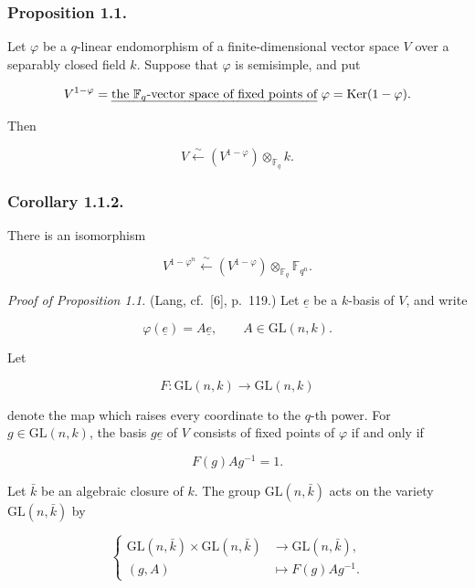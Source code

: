 \subsubsection*{Proposition 1.1.}
Let $\varphi$ be a $q$-linear endomorphism of a finite-dimensional vector
space $V$ over a separably closed field $k$. Suppose that $\varphi$ is
semisimple, and put

\[
V^{1-\varphi}
=\text{\underline{the $\mathbb F_q$-vector space of fixed points of} $\varphi$}
=\Ker(1-\varphi).
\]

Then

\begin{equation}\tag{1.1.1}
V\xleftarrow{\ \sim\ }
(V^{1-\varphi})\otimes_{\mathbb F_q}k.
\end{equation}

\subsubsection*{Corollary 1.1.2.}
There is an isomorphism

\[
V^{1-\varphi^n}\xleftarrow{\ \sim\ }
(V^{1-\varphi})\otimes_{\mathbb F_q}\mathbb F_{q^n}.
\]

\medskip
\noindent\emph{Proof of Proposition 1.1.}
(Lang, cf.~[6], p.~119.)
Let $\underline{e}$ be a $k$-basis of $V$, and write

\begin{equation}\tag{1.1.3}
\varphi(\underline{e})=A\underline{e},\qquad A\in\mathrm{GL}(n,k).
\end{equation}

Let

\begin{equation}\tag{1.1.4}
F:\mathrm{GL}(n,k)\longrightarrow\mathrm{GL}(n,k)
\end{equation}

denote the map which raises every coordinate to the $q$-th power. For
$g\in\mathrm{GL}(n,k)$, the basis $g\underline{e}$ of $V$ consists of fixed points of
$\varphi$ if and only if

\begin{equation}\tag{1.1.5}
F(g)Ag^{-1}=1.
\end{equation}

Let $\bar k$ be an algebraic closure of $k$. The group
$\mathrm{GL}(n,\bar k)$ acts on the variety $\mathrm{GL}(n,\bar k)$ by

\begin{equation}\tag{1.1.6}
\left\{
\begin{aligned}
\mathrm{GL}(n,\bar k)\times\mathrm{GL}(n,\bar k)
&\longrightarrow\mathrm{GL}(n,\bar k),\\
(g,A)&\longmapsto F(g)Ag^{-1}.
\end{aligned}
\right.
\end{equation}

